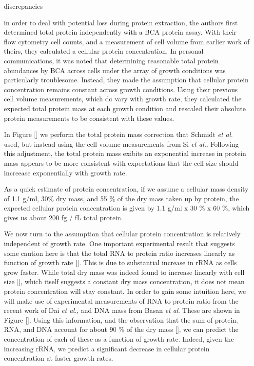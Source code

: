 discrepancies \documentclass[11pt, letterpaper]{article}
\begin{document}
in order to deal with
potential loss during protein extraction, the authors first determined total
protein independently with a BCA protein assay. With their flow cytometry cell
counts, and a measurement of cell volume from earlier work of theirs, they
calculated a cellular protein  concentration. In personal communications, it was
noted that  determining reasonable total protein abundances by BCA across cells
under the array of growth conditions  was particularly troublesome. Instead, they
made the assumption that cellular protein concentration remains constant  across
growth conditions. Using their previous cell volume measurements, which do vary
with growth rate, they calculated the expected  total protein mass at each
growth condition and rescaled their absolute protein measurements to be
consistent  with these values.

In Figure [] we perform the total protein mass correction that Schmidt {\it et
al.} used, but instead  using the cell volume measurements from Si {\it et al.}.
Following this adjustment, the total protein mass exibits an exponential
increase in protein mass appears to be more consistent  with expectations that
the cell size should increease exponentially with growth rate.

As a quick estimate of protein concentration, if we assume a cellular mass
density of 1.1 g/ml, 30\% dry mass, and 55 \% of the dry mass taken up by
protein, the expected cellular protein concentration is given by 1.1 g/ml
x 30 \% x 60 \%, which gives us about 200 fg / fL total protein.

We now turn to the assumption that cellular protein concentration is relatively
independent of growth rate. One important experimental result that suggests some
caution here is that the total RNA to protein ratio increases linearly as
function of growth rate []. This is due to substantial increase in rRNA as cells
grow faster. While total dry mass was indeed found to increase linearly with
cell size [], which itself suggests a constant dry mass concentration, it does
not mean protein concentration will stay constant. In order to gain some
intuition here, we will make use of experimental measurements of RNA to protein
ratio from the recent work of Dai {\it et al.}, and DNA mass from Basan {\it et
al}. These are shown in Figure []. Using this information, and the observation
that the  sum of protein, RNA, and DNA account for about 90 \% of the dry mass [],
we can predict the  concentration of each of these as a function of growth rate.
Indeed, given the  increasing rRNA, we predict a significant
decrease in cellular protein concentration at faster growth rates.
\end{document}
